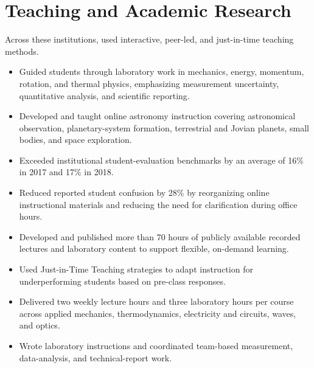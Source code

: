 \section{Teaching and Academic Research}
\label{sec:teaching}

Across these institutions, used interactive, peer-led, and just-in-time teaching methods.

\begin{itemize}
  \item Guided students through laboratory work in mechanics, energy, momentum, rotation, and thermal physics, emphasizing measurement uncertainty, quantitative analysis, and scientific reporting.
  \item Developed and taught online astronomy instruction covering astronomical observation, planetary-system formation, terrestrial and Jovian planets, small bodies, and space exploration.
  \item Exceeded institutional student-evaluation benchmarks by an average of 16\% in 2017 and 17\% in 2018.
  \item Reduced reported student confusion by 28\% by reorganizing online instructional materials and reducing the need for clarification during office hours.
  \item Developed and published more than 70 hours of publicly available recorded lectures and laboratory content to support flexible, on-demand learning.
  \item Used Just-in-Time Teaching strategies to adapt instruction for underperforming students based on pre-class responses.
\end{itemize}
\begin{itemize}
  \item Delivered two weekly lecture hours and three laboratory hours per course across applied mechanics, thermodynamics, electricity and circuits, waves, and optics.
  \item Wrote laboratory instructions and coordinated team-based measurement, data-analysis, and technical-report work.
\end{itemize}
